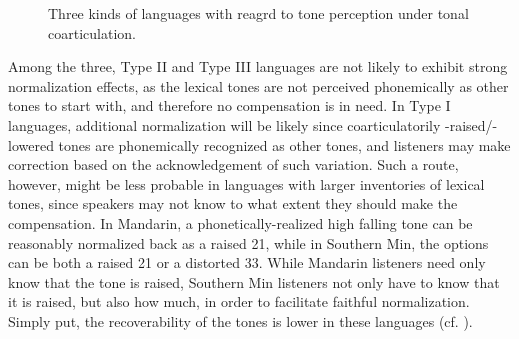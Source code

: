 \begin{figure}[hbt!]

\caption{Three kinds of languages with reagrd to tone perception under tonal coarticulation.}
\label{Figure:ThreePossibleScenarios}
\end{figure}
Among the three, Type II and Type III languages are not likely to exhibit strong normalization effects, as the lexical tones are not perceived phonemically as other tones to start with, and therefore no compensation is in need. In Type I languages, additional normalization will be likely since coarticulatorily -raised/-lowered tones are phonemically recognized as other tones, and listeners may make correction based on the acknowledgement of such variation. Such a route, however, might be less probable in languages with larger inventories of lexical tones, since speakers may not know to what extent they should make the compensation. In Mandarin, a phonetically-realized high falling tone can be reasonably normalized back as a raised 21, while in Southern Min, the options can be both a raised 21 or a distorted 33. While Mandarin listeners need only know that the tone is raised, Southern Min listeners not only have to know that it is raised, but also how much, in order to facilitate faithful normalization. Simply put, the recoverability of the tones is lower in these languages (cf. \citealp{Flemming2011}).

